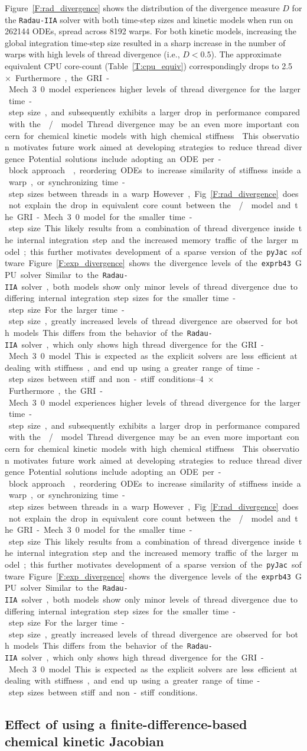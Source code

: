\documentclass[preprint]{elsarticle}
\begin{document}
Figure~\ref{F:rad_divergence} shows the distribution of the divergence measure $D$ for the \texttt{Radau-IIA} solver with both time-step sizes and kinetic models when run on \num{262144} ODEs, spread across \num{8192} warps.
For both kinetic models, increasing the global  integration time-step size resulted in a sharp increase in the number of warps with high levels of thread divergence (i.e., $D < 0.5$).
The approximate equivalent CPU core-count (Table~\ref{T:cpu_equiv}) correspondingly drops to \SIrange{2.5}{4}{$\times$}.
Furthermore, the GRI-Mech 3.0 model experiences higher levels of thread divergence for the larger time-step size, and subsequently exhibits a larger drop in performance compared with the \slash{} model.
Thread divergence may be an even more important concern for chemical kinetic models with high chemical stiffness.
This observation motivates future work aimed at developing strategies to reduce thread divergence.
Potential solutions include adopting an ODE per-block approach~\cite{Stone:2013aa}, reordering ODEs to increase similarity of stiffness inside a warp, or synchronizing time-step sizes between threads in a warp.
However, Fig.~\ref{F:rad_divergence} does not explain the drop in equivalent core count between the \slash{} model and the GRI-Mech 3.0 model for the smaller time-step size.
This likely results from a combination of thread divergence inside the internal integration step and the increased memory traffic of the larger model; this further motivates development of a sparse version of the \texttt{pyJac} software.

Figure~\ref{F:exp_divergence} shows the divergence levels of the \texttt{exprb43} GPU solver.
Similar to the \texttt{Radau-IIA} solver, both models show only minor levels of thread divergence due to differing internal integration step sizes for the smaller time-step size.
For the larger time-step size, greatly increased levels of thread divergence are observed for both models.
This differs from the behavior of the \texttt{Radau-IIA} solver, which only shows high thread divergence for the GRI-Mech 3.0 model.
This is expected as the explicit solvers are less efficient at dealing with stiffness, and end up using a greater range of time-step sizes between stiff and non-stiff conditions.

\subsection{Effect of using a finite-difference-based chemical kinetic Jacobian}
\end{document}
